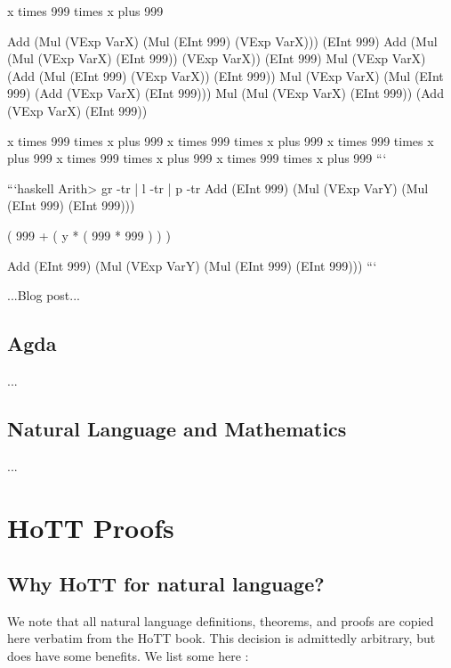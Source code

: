\documentclass[11pt, a4paper]{article}
\begin{document}
x times 999 times x plus 999

Add (Mul (VExp VarX) (Mul (EInt 999) (VExp VarX))) (EInt 999) Add (Mul (Mul
(VExp VarX) (EInt 999)) (VExp VarX)) (EInt 999) Mul (VExp VarX) (Add (Mul (EInt
999) (VExp VarX)) (EInt 999)) Mul (VExp VarX) (Mul (EInt 999) (Add (VExp VarX)
(EInt 999))) Mul (Mul (VExp VarX) (EInt 999)) (Add (VExp VarX) (EInt 999))

x times 999 times x plus 999 x times 999 times x plus 999 x times 999 times x
plus 999 x times 999 times x plus 999 x times 999 times x plus 999 ```

```haskell Arith> gr -tr | l -tr | p -tr Add (EInt 999) (Mul (VExp VarY) (Mul
(EInt 999) (EInt 999)))

( 999 + ( y * ( 999 * 999 ) ) )

Add (EInt 999) (Mul (VExp VarY) (Mul (EInt 999) (EInt 999))) ```



...Blog post...


\subsection{Agda}

...

\subsection{Natural Language and Mathematics}

...

\section{HoTT Proofs}

\subsection{Why HoTT for natural language?}

We note that all natural language definitions, theorems, and proofs are copied
here verbatim from the HoTT book. This decision is admittedly arbitrary, but
does have some benefits. We list some here :
\end{document}
